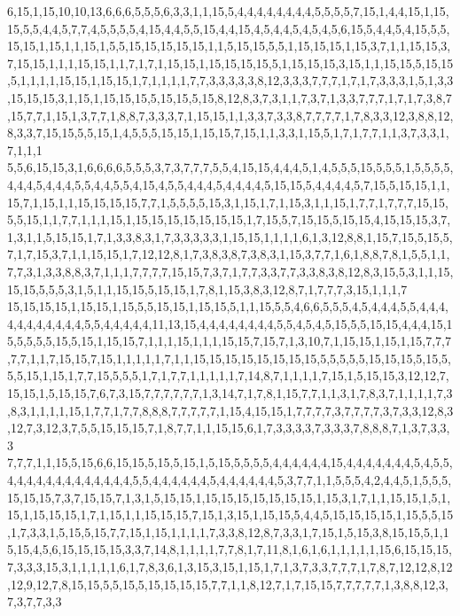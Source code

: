 6,15,1,15,10,10,13,6,6,6,5,5,5,6,3,3,1,1,15,5,4,4,4,4,4,4,4,4,5,5,5,5,7,15,1,4,4,15,1,15,15,5,5,4,4,5,7,7,4,5,5,5,5,4,15,4,4,5,5,15,4,4,15,4,5,4,4,5,4,5,4,5,6,15,5,4,4,5,4,15,5,5,15,15,1,15,1,1,15,1,5,5,15,15,15,15,15,1,1,5,15,15,5,5,1,15,15,15,1,15,3,7,1,1,15,15,3,7,15,15,1,1,1,15,15,1,1,7,1,7,1,15,15,1,15,15,15,15,5,1,15,15,15,3,15,1,1,15,15,5,15,15,5,1,1,1,1,15,15,1,15,15,1,7,1,1,1,1,7,7,3,3,3,3,3,8,12,3,3,3,7,7,7,1,7,1,7,3,3,3,1,5,1,3,3,15,15,15,3,1,15,1,15,15,15,5,15,15,5,15,8,12,8,3,7,3,1,1,7,3,7,1,3,3,7,7,7,1,7,1,7,3,8,7,15,7,7,1,15,1,3,7,7,1,8,8,7,3,3,3,7,1,15,15,1,1,3,3,7,3,3,8,7,7,7,7,1,7,8,3,3,12,3,8,8,12,8,3,3,7,15,15,5,5,15,1,4,5,5,5,15,15,1,15,15,7,15,1,1,3,3,1,15,5,1,7,1,7,7,1,1,3,7,3,3,1,7,1,1,1
5,5,6,15,15,3,1,6,6,6,6,5,5,5,3,7,3,7,7,7,5,5,4,15,15,4,4,4,5,1,4,5,5,5,15,5,5,5,1,5,5,5,5,4,4,4,5,4,4,4,5,5,4,4,5,5,4,15,4,5,5,4,4,4,5,4,4,4,4,5,15,15,5,4,4,4,4,5,7,15,5,15,15,1,1,15,7,1,15,1,1,15,15,15,15,7,7,1,5,5,5,5,15,3,1,15,1,7,1,15,3,1,1,15,1,7,7,1,7,7,7,15,15,5,5,15,1,1,7,7,1,1,1,15,1,15,15,15,15,15,15,15,1,7,15,5,7,15,15,5,15,15,4,15,15,15,3,7,1,3,1,1,5,15,15,1,7,1,3,3,8,3,1,7,3,3,3,3,3,1,15,15,1,1,1,1,6,1,3,12,8,8,1,15,7,15,5,15,5,7,1,7,15,3,7,1,1,15,15,1,7,12,12,8,1,7,3,8,3,8,7,3,8,3,1,15,3,7,7,1,6,1,8,8,7,8,1,5,5,1,1,7,7,3,1,3,3,8,8,3,7,1,1,1,7,7,7,7,15,15,7,3,7,1,7,7,3,3,7,7,3,3,8,3,8,12,8,3,15,5,3,1,1,15,15,15,5,5,5,3,1,5,1,1,15,15,5,15,15,1,7,8,1,15,3,8,3,12,8,7,1,7,7,7,3,15,1,1,1,7
15,15,15,15,1,15,15,1,15,5,5,15,15,1,15,15,5,1,1,15,5,5,4,6,6,5,5,5,4,5,4,4,4,5,5,4,4,4,4,4,4,4,4,4,4,4,5,5,4,4,4,4,4,11,13,15,4,4,4,4,4,4,4,4,5,5,4,5,4,5,15,5,5,15,15,4,4,4,15,15,5,5,5,5,15,5,15,1,15,15,7,1,1,1,15,1,1,1,15,15,7,15,7,1,3,10,7,1,15,15,1,15,1,15,7,7,7,7,7,1,1,7,15,15,7,15,1,1,1,1,1,7,1,1,15,15,15,15,15,15,15,15,5,5,5,5,5,15,15,15,5,15,5,5,5,15,1,15,1,7,7,15,5,5,5,1,7,1,7,7,1,1,1,1,1,7,14,8,7,1,1,1,1,7,15,1,5,15,15,3,12,12,7,15,15,1,5,15,15,7,6,7,3,15,7,7,7,7,7,7,1,3,14,7,1,7,8,1,15,7,7,1,1,3,1,7,8,3,7,1,1,1,1,7,3,8,3,1,1,1,1,15,1,7,7,1,7,7,8,8,8,7,7,7,7,7,1,15,4,15,15,1,7,7,7,7,3,7,7,7,7,3,7,3,3,12,8,3,12,7,3,12,3,7,5,5,15,15,15,7,1,8,7,7,1,1,15,15,6,1,7,3,3,3,3,7,3,3,3,7,8,8,8,7,1,3,7,3,3,3
7,7,7,1,1,15,5,15,6,6,15,15,5,15,5,15,1,5,15,5,5,5,5,4,4,4,4,4,4,15,4,4,4,4,4,4,4,5,4,5,5,4,4,4,4,4,4,4,4,4,4,4,4,4,5,5,4,4,4,4,4,4,5,4,4,4,4,4,4,5,3,7,7,1,1,5,5,5,4,2,4,4,5,1,5,5,5,15,15,15,7,3,7,15,15,7,1,3,1,5,15,15,1,15,15,15,15,15,15,15,1,15,3,1,7,1,1,15,15,1,5,1,15,1,15,15,15,1,7,1,15,1,1,15,15,15,7,15,1,3,15,1,15,15,5,4,4,5,15,15,15,15,1,15,5,5,15,1,7,3,3,1,5,15,5,15,7,7,15,1,15,1,1,1,1,7,3,3,8,12,8,7,3,3,1,7,15,1,5,15,3,8,15,15,5,1,15,15,4,5,6,15,15,15,15,3,3,7,14,8,1,1,1,1,7,7,8,1,7,11,8,1,6,1,6,1,1,1,1,1,15,6,15,15,15,7,3,3,3,15,3,1,1,1,1,1,6,1,7,8,3,6,1,3,15,3,15,1,15,1,7,1,3,7,3,3,7,7,7,1,7,8,7,12,12,8,12,12,9,12,7,8,15,15,5,5,15,5,15,15,15,15,7,7,1,1,8,12,7,1,7,15,15,7,7,7,7,7,1,3,8,8,12,3,7,3,7,7,3,3
